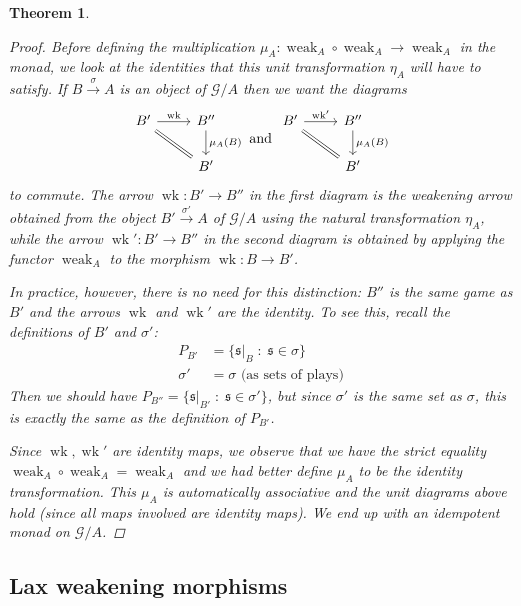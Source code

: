 \documentclass[11pt]{article} %
\theoremstyle{plain} %
\newtheorem{theorem}{Theorem}[section]
\theoremstyle{definition} %
\theoremstyle{note}
\theoremstyle{exercisestyle}
\newcommand{\map}[3]{#2\xrightarrow{#1} #3}
\newcommand*\from{\colon}
\newcommand{\cmap}[3]{#1\from{}#2\to{}#3}
\newcommand{\comp}[2]{#1 \circ #2}
\newcommand{\G}{\mathcal G}
\newcommand{\suchthat}{\;\colon\;}
\newcommand{\s}{\mathfrak s}
\DeclareMathOperator{\wk}{wk}
\DeclareMathOperator{\weak}{weak}
\begin{document}
\begin{theorem}
\begin{proof}
   Before defining the multiplication $\cmap{\mu_A}{\comp{\weak_A}{\weak_A}}{\weak_A}$ in the monad, we look at the identities that this unit transformation $\eta_A$ will have to satisfy.  If $\map{\sigma}{B}{A}$ is an object of $\G/A$ then we want the diagrams
   \[
     \begin{tikzcd}
       B' \arrow[r, "\wk"] \arrow[dr, equals]
         & B'' \arrow[d, "\mu_A(B)"] \\
         & B'
     \end{tikzcd}
     \textrm{ and }
     \begin{tikzcd}
       B' \arrow[r, "\wk'"] \arrow[dr, equals]
         & B'' \arrow[d, "\mu_A(B)"] \\
         & B'
     \end{tikzcd}
     \]
   to commute.  The arrow $\cmap{\wk}{B'}{B''}$ in the first diagram is the weakening arrow obtained from the object $\map{\sigma'}{B'}{A}$ of $\G/A$ using the natural transformation $\eta_A$, while the arrow $\cmap{\wk'}{B'}{B''}$ in the second diagram is obtained by applying the functor $\weak_A$ to the morphism $\cmap{\wk}{B}{B'}$.  

   In practice, however, there is no need for this distinction: $B''$ is the same game as $B'$ and the arrows $\wk$ and $\wk'$ are the identity.  To see this, recall the definitions of $B'$ and $\sigma'$:
   \begin{align*}
     P_{B'} & = \{\s\vert_B\suchthat \s\in\sigma\} \\
     \sigma' & = \sigma\textrm{ (as sets of plays)}
   \end{align*}
   Then we should have $P_{B''} = \{\s\vert_{B'}\suchthat \s\in\sigma'\}$, but since $\sigma'$ is the same set as $\sigma$, this is exactly the same as the definition of $P_{B'}$.  

   Since $\wk,\wk'$ are identity maps, we observe that we have the strict equality $\comp{\weak_A}{\weak_A}=\weak_A$ and we had better define $\mu_A$ to be the identity transformation.  This $\mu_A$ is automatically associative and the unit diagrams above hold (since all maps involved are identity maps).  We end up with an idempotent monad on $\G/A$.
  \end{proof}
\end{theorem}

\subsection{Lax weakening morphisms}
\end{document}
